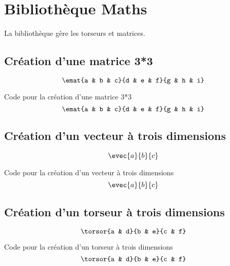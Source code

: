 \chapter{Bibliothèque Maths}

La bibliothèque  gère les torseurs et matrices.

\section{Création d'une matrice 3*3}

$$\emat{a & b & c}{d & e & f}{g & h & i}  $$
\vskip 0.5cm

\begin{Latex}{Code pour la création d'une matrice 3*3}
    $$\emat{a & b & c}{d & e & f}{g & h & i}  $$
\end{Latex}

\section{Création d'un vecteur à trois dimensions}

$$\evec{a}{b}{c}  $$
\vskip 0.5cm

\begin{Latex}{Code pour la création d'un vecteur à trois dimensions}
    $$\evec{a}{b}{c}  $$
\end{Latex}


\section{Création d'un torseur à trois dimensions}

$$\torsor{a & d}{b & e}{c & f}  $$
\vskip 0.5cm

\begin{Latex}{Code pour la création d'un torseur à trois dimensions}
    $$\torsor{a & d}{b & e}{c & f}  $$
\end{Latex}

